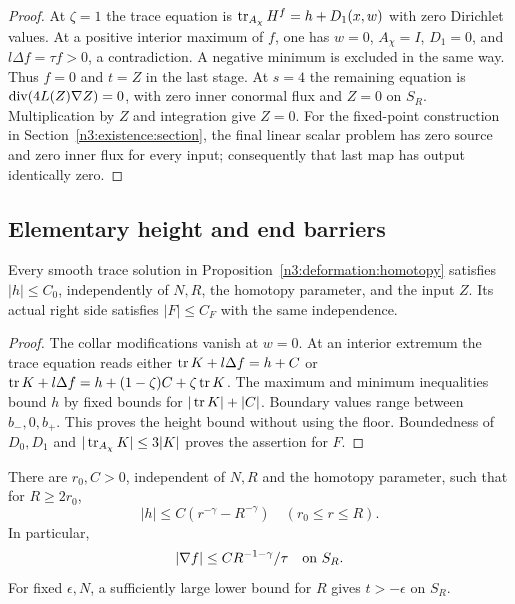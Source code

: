 \begin{proof}
At $\zeta=1$ the trace equation is
$\operatorname{tr}_{A_\chi}H^f=h+D_1(x,w)$ with zero Dirichlet values.
At a positive interior maximum of $f$, one has $w=0$, $A_\chi=I$,
$D_1=0$, and $l\Delta f=\tau f>0$, a contradiction.
A negative minimum is excluded in the same way.
Thus $f=0$ and $t=Z$ in the last stage.
At $s=4$ the remaining equation is
$\operatorname{div}(4L(Z)\nabla Z)=0$, with zero inner conormal flux and $Z=0$ on
$S_R$. Multiplication by $Z$ and integration give $Z=0$.
For the fixed-point construction in Section~\ref{n3:existence:section},
the final linear scalar problem has zero source and zero inner flux
for every input; consequently that last map has output identically zero.
\end{proof}

\subsection{Elementary height and end barriers}

\begin{lemma}\label{n3:deformation:height}
Every smooth trace solution in Proposition~\ref{n3:deformation:homotopy}
satisfies $|h|\le C_0$, independently of $N,R$, the homotopy parameter,
and the input $Z$. Its actual right side satisfies $|F|\le C_F$
with the same independence.
\end{lemma}

\begin{proof}
The collar modifications vanish at $w=0$.
At an interior extremum the trace equation reads either
$\operatorname{tr} K+l\Delta f=h+C$ or
$\operatorname{tr} K+l\Delta f=h+(1-\zeta)C+\zeta\operatorname{tr} K$.
The maximum and minimum inequalities bound $h$ by fixed bounds for
$|\operatorname{tr} K|+|C|$. Boundary values range between $b_-,0,b_+$.
This proves the height bound without using the floor.
Boundedness of $D_0,D_1$ and $|\operatorname{tr}_{A_\chi}K|\le3|K|$ proves the
assertion for $F$.
\end{proof}

\begin{lemma}\label{n3:deformation:end-height}
There are $r_0,C>0$, independent of $N,R$ and the homotopy parameter, such
that for $R\ge2r_0$,
\begin{equation}\label{n3:deformation:end-height-estimate}
 |h|\le C(r^{-\gamma}-R^{-\gamma})\quad(r_0\le r\le R).
\end{equation}
In particular,
\begin{equation}\label{n3:deformation:outer-gradient}
 |\nabla f|\le C R^{-1-\gamma}/\tau\quad\hbox{on }S_R.
\end{equation}
For fixed $\epsilon,N$, a sufficiently large lower bound for $R$ gives
$t>-\epsilon$ on $S_R$.
\end{lemma}


